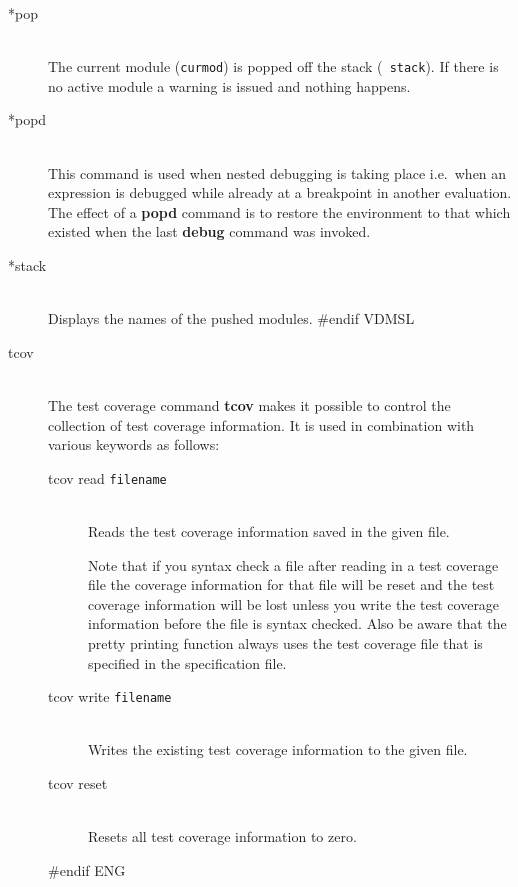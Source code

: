 \documentclass[\pformat,12pt]{article}
\begin{document}
\begin{description}
\item[*pop] \mbox{}\\
  The current module ({\tt curmod}) is popped off the stack ({\tt
    stack}). If there is no active module a warning is issued and
  nothing happens.
  
\item[*popd] \mbox{}\\
  This command is used when nested debugging is taking place i.e.\ when
  an expression is debugged while already at a breakpoint in another
  evaluation. The effect of a
  \textbf{popd} command is to restore the environment to that which
  existed when the last \textbf{debug} command was invoked.

\item[*stack]\mbox{}\\
  Displays the names of the pushed modules.
#endif VDMSL

\item[tcov]\mbox{}\\
The test coverage command {\bf tcov} makes it possible to control 
the collection of test coverage information. It is used in combination 
with various keywords as follows:

\begin{description}
\item[tcov read \mbox{\texttt{filename}}] \mbox{}\\ 
  Reads the test coverage information saved in the given file.
  
  Note that if you syntax check a file after reading in a test coverage 
  file the coverage information for that file will be reset and the test coverage
  information will be lost unless you  write the test coverage information
  before the file is syntax checked.
  Also be aware that the pretty printing function always uses the test coverage
  file that is specified in the specification file.

\item[tcov write \mbox{\texttt{filename}}] \mbox{} \\ 
  Writes the existing test coverage information to the given file.
  
\item[tcov reset] \mbox{} \\
  Resets all test coverage information to zero.
  
\end{description}
#endif ENG


\end{description}
\end{document}

